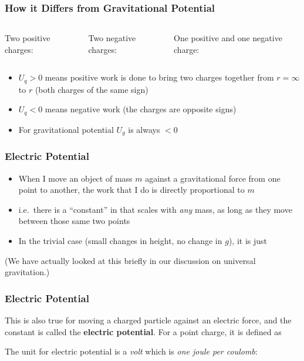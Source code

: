 \documentclass[12pt,aspectratio=169]{beamer}
\newcommand{\eq}[2]{\vspace{#1}{\Large\begin{displaymath}#2\end{displaymath}}}
\begin{document}
\begin{frame}
  \frametitle{How it Differs from Gravitational Potential}
  \begin{columns}
    \begin{center}
      Two positive charges:

      \eq{-0.3in}{U_q>0}
    \end{center}
    \begin{center}
      Two negative charges:

      \eq{-0.3in}{U_q>0}
    \end{center}
    \begin{center}
      One positive and one negative charge:

      \eq{-0.5in}{U_q<0}
    \end{center}
  \end{columns}

  \begin{itemize}
  \item $U_q>0$ means positive work is done to bring two charges together from
   $r=\infty$ to $r$ (both charges of the same sign)
  \item $U_q<0$ means negative work (the charges are opposite signs)
  \item For gravitational potential $U_g$ is always $<0$
  \end{itemize}
\end{frame}

\begin{frame}
  \frametitle{Electric Potential}
  \begin{itemize}
  \item When I move an object of mass $m$ against a gravitational force from
    one point to another, the work that I do is directly proportional to $m$
  \item i.e.\ there is a ``constant'' in that scales with \emph{any} mass, as
    long as they move between those same two points
  \item In the trivial case (small changes in height, no change in $g$), it is
    just

    \eq{-.2in}{
      \frac{\Delta U_q}{m}=g\Delta h
    }
  \end{itemize}
  (We have actually looked at this briefly in our discussion on universal
  gravitation.)
\end{frame}


\begin{frame}
  \frametitle{Electric Potential}

  This is also true for moving a charged particle against an electric force,
  and the constant is called the \textbf{electric potential}. For a point
  charge, it is defined as

  \eq{-.2in}{
    \boxed{V=\frac{U_q}{q}=\frac{kq}{r}}
  }

  The unit for electric potential is a \emph{volt} which is
  \emph{one joule per coulomb}:

  \eq{-.25in}{
    \SI{1}{V}=\SI{1}{J/C}
  }
\end{frame}
\end{document}
